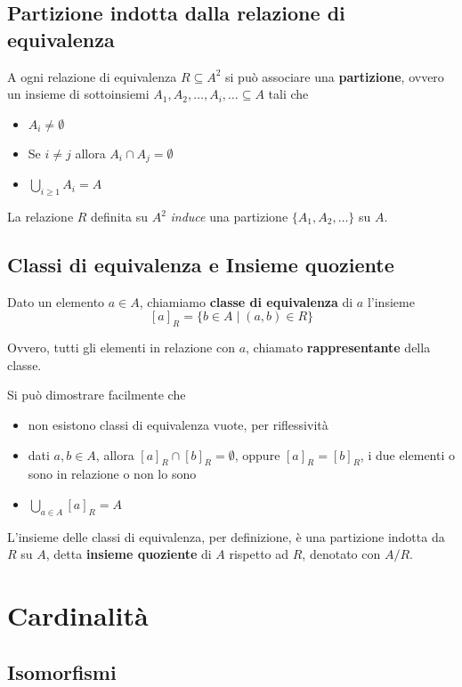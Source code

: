 \subsection{Partizione indotta dalla relazione di equivalenza}

A ogni relazione di equivalenza $R \subseteq A^2$ si può associare una \textbf{partizione}, ovvero un insieme di sottoinsiemi $A_{1}, A_{2}, \ldots, A_i, \ldots \subseteq A$ tali che
\begin{itemize}
	\item $A_i \neq \emptyset$
	
    \item Se $i \neq j$ allora $A_i \cap A_j = \emptyset$
	
    \item $\bigcup_{i \geq 1} A_i = A$
\end{itemize}

La relazione $R$ definita su $A^2$ \textit{induce} una partizione $\{A_1, A_2, \dots\}$ su $A$.

\subsection{Classi di equivalenza e Insieme quoziente}
Dato un elemento $a \in A$, chiamiamo \textbf{classe di equivalenza} di $a$ l'insieme
$$ [a]_R = \{b \in A \mid (a,b) \in R \} $$

Ovvero, tutti gli elementi in relazione con $a$, chiamato \textbf{rappresentante} della classe.

Si può dimostrare facilmente che
\begin{itemize}
	\item non esistono classi di equivalenza vuote, per riflessività
	\item dati $a,b \in A$, allora $[a]_R \cap [b]_R = \emptyset$, oppure $[a]_R = [b]_R$, i due elementi o sono in relazione o non lo sono
	\item $\bigcup_{a \in A} [a]_R = A$
\end{itemize}

L'insieme delle classi di equivalenza, per definizione, è una partizione indotta da $R$ su $A$, detta \textbf{insieme quoziente} di $A$ rispetto ad $R$, denotato con $A / R$.

\section{Cardinalità}

\subsection{Isomorfismi}

